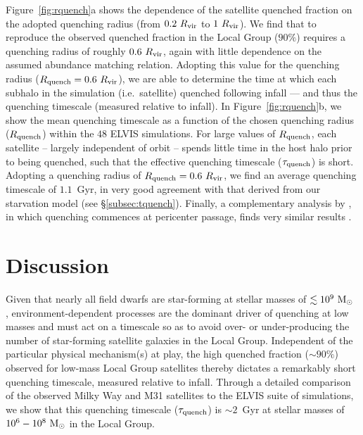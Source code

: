 \documentclass[usenatbib]{mn2e}
\newcommand{\msun}{{\rm M}_{\odot}}
\begin{document}
Figure~\ref{fig:rquench}a shows the dependence of the satellite
quenched fraction on the adopted quenching radius (from $0.2~R_{\rm
  vir}$ to $1~R_{\rm vir}$). We find that to reproduce the observed
quenched fraction in the Local Group ($90\%$) requires a quenching
radius of roughly $0.6~R_{\rm vir}$, again with little dependence on
the assumed abundance matching relation. Adopting this value for the
quenching radius ($R_{\rm quench} = 0.6~R_{\rm vir}$), we are able to
determine the time at which each subhalo in the simulation
(i.e.~satellite) quenched following infall --- and thus the quenching
timescale (measured relative to infall). In Figure~\ref{fig:rquench}b,
we show the mean quenching timescale as a function of the chosen
quenching radius ($R_{\rm quench}$) within the $48$ ELVIS
simulations. For large values of $R_{\rm quench}$, each satellite --
largely independent of orbit -- spends little time in the host halo
prior to being quenched, such that the effective quenching timescale
($\tau_{\rm quench}$) is short. Adopting a quenching radius of $R_{\rm
  quench} = 0.6~R_{\rm vir}$, we find an average quenching timescale
of $1.1$~Gyr, in very good agreement with that derived from our
starvation model (see \S\ref{subsec:tquench}). Finally, a
complementary analysis by \citet{slater14}, in which quenching
commences at pericenter passage, finds very similar results
\citep[$\tau_{\rm quench} \sim 1-2$~Gyr, see also][]{weisz15, wetzel15b}.



\section{Discussion}
\label{sec:discussion}



Given that nearly all field dwarfs are star-forming at stellar masses
of $\lesssim 10^{9}~\msun$ \citep{grebel97, mateo98, geha12},
environment-dependent processes are the dominant driver of quenching
at low masses and must act on a timescale so as to avoid over- or
under-producing the number of star-forming satellite galaxies in the
Local Group. Independent of the particular physical mechanism(s) at
play, the high quenched fraction ($\sim90\%$) observed for low-mass
Local Group satellites thereby dictates a remarkably short quenching
timescale, measured relative to infall. Through a detailed comparison
of the observed Milky Way and M31 satellites to the ELVIS suite of
simulations, we show that this quenching timescale ($\tau_{\rm
  quench}$) is $\sim 2$~Gyr at stellar masses of
$10^{6}-10^{8}~\msun$ in the Local Group.
\end{document}
